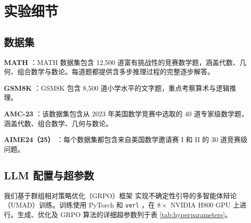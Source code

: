 \documentclass{article}
\theoremstyle{plain}
\theoremstyle{definition}
\theoremstyle{remark}
\begin{document}
\clearpage
\section{实验细节}
\label{app:experiment_details}

\subsection{数据集}

\textbf{MATH} \cite{hendrycks2021measuring}：MATH 数据集包含 12,500 道富有挑战性的竞赛数学题，涵盖代数、几何、组合数学与数论。每道题都提供含多步推理过程的完整逐步解答。

\textbf{GSM8K} \cite{cobbe2021training}：GSM8K 包含 8,500 道小学水平的文字题，重点考察算术与逻辑推理。

\textbf{AMC-23} \cite{amc2023}：该数据集包含从 2023 年美国数学竞赛中选取的 40 道专家级数学题，涵盖代数、组合数学、几何与数论。

\textbf{AIME24（25）} \cite{aops_aime_2024,aops_aime_2025}：每个数据集都包含来自美国数学邀请赛 I 和 II 的 30 道竞赛级问题。



\subsection{LLM 配置与超参数}\label{app:umad_details}

我们基于群组相对策略优化（GRPO）框架 \cite{shao2024deepseekmath} 实现不确定性引导的多智能体辩论（UMAD）训练。训练使用 PyTorch 和 \texttt{verl} \cite{sheng2025hybridflow}，在 $8 \times$ NVIDIA H800 GPU 上进行。生成、优化及 GRPO 算法的详细超参数列于表 \ref{tab:hyperparameters}。
\end{document}
